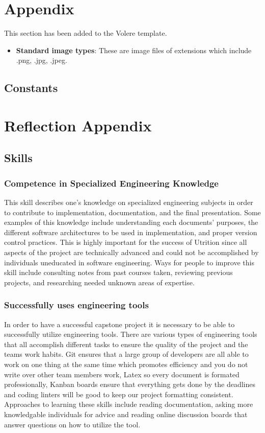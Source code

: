\documentclass[12pt]{article}
\begin{document}
\section{Appendix}
This section has been added to the Volere template.
\begin{itemize}
	\item \textbf{Standard image types}: These are image files of extensions which include .png, .jpg, .jpeg.
\end{itemize}

\subsection{Constants}

\section{Reflection Appendix}
\subsection{Skills}
\subsubsection{Competence in Specialized Engineering Knowledge}
This skill describes one's knowledge on specialized engineering subjects in order to contribute to implementation, documentation, and the final presentation. Some examples of this knowledge include understanding each documents' purposes, the different software architectures to be used in implementation, and proper version control practices. This is highly important for the success of Utrition since all aspects of the project are technically advanced and could not be accomplished by individuals uneducated in software engineering. Ways for people to improve this skill include consulting notes from past courses taken, reviewing previous projects, and researching needed unknown areas of expertise.
\subsubsection{Successfully uses engineering tools}
In order to have a successful capstone project it is necessary to be able to successfully utilize engineering tools. There are various types of engineering tools that all accomplish different tasks to ensure the quality of the project and the teams work habits. Git ensures that a large group of developers are all able to work on one thing at the same time which promotes efficiency and you do not write over other team members work, Latex so every document is formated professionally, Kanban boards ensure that everything gets done by the deadlines and coding linters will be good to keep our project formatting consistent. Approaches to learning these skills include reading documentation, asking more knowledgable individuals for advice and reading online discussion boards that answer questions on how to utilize the tool. 
\end{document}
